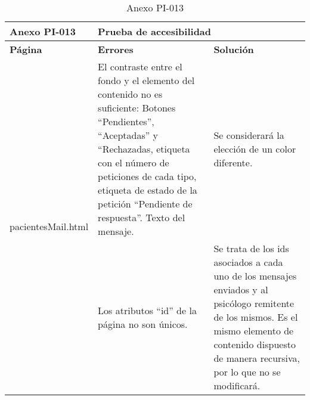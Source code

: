 \begin{table}[htpb]
\centering
\begin{tabularx}{\textwidth}{|l|X|X|}
\hline
\rowcolor[gray]{0.9}\textbf{Anexo PI-013}               & \multicolumn{2}{l|}{\textbf{Prueba de accesibilidad}}                                                                                                                                                                                                                                                                                                                                                                                                            \\ \hline
\textbf{Página}                     & \textbf{Errores}                                                                                                                                                                                                                                       & \textbf{Solución}                                                                                                                                                                                       \\ \hline
\multirow{2}{*}{pacientesMail.html} & El contraste entre el fondo y el elemento del contenido no es suficiente: Botones “Pendientes”, “Aceptadas” y “Rechazadas, etiqueta con el número de peticiones de cada tipo, etiqueta de estado de la petición “Pendiente de respuesta”. Texto del mensaje. & Se considerará la elección de un color diferente.                                                                                                                                                       \\ \cline{2-3} 
                                    & Los atributos “id” de la página no son únicos.                                                                                                                                                                                                         & Se trata de los ids asociados a cada uno de los mensajes enviados y al psicólogo remitente de los mismos. Es el mismo elemento de contenido dispuesto de manera recursiva, por lo que no se modificará. \\ \hline
\end{tabularx}
\caption{Anexo PI-013}
\end{table}


